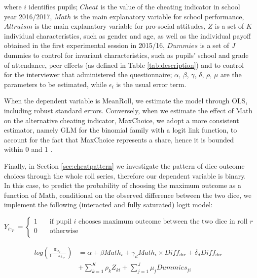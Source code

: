 \documentclass[authoryear, preprint, review, 12pt]{elsarticle}
\begin{document}
where $i$ identifies pupils; $Cheat$ is the value of the cheating indicator in school year 2016/2017, $Math$ is the main explanatory variable for school performance, $Altruism$ is the main explanatory variable for pro-social attitudes, $Z$ is a set of $K$ individual characteristics, such as gender and age, as well as the individual payoff obtained in the first experimental session in 2015/16, $Dummies$ is a set of $J$ dummies to control for invariant characteristics, such as pupils' school and grade of attendance, peer effects (as defined in Table \ref{tab:description}) and to control for the interviewer that administered the questionnaire; $\alpha$, $\beta$, $\gamma$, $\delta$, $\rho$, $\mu$ are the parameters to be estimated, while $\epsilon_{i}$ is the usual error term. 

When the dependent variable is MeanRoll, we estimate the model through OLS, including robust standard errors. Conversely, when we estimate the effect of Math on the alternative cheating indicator, MaxChoice, we adopt a more consistent estimator, namely GLM for the binomial family with a logit link function, to account for the fact that MaxChoice represents a share, hence it is bounded within 0 and 1 \citep{papkewoolridge96}.

Finally, in Section \ref{sec:cheatpattern} we investigate the pattern of dice outcome choices through the whole roll series, therefore our dependent variable is binary. In this case, to predict the probability of choosing the maximum outcome as a function of Math, conditional on the observed difference between the two dice, we implement the following (interacted and fully saturated) logit model:

\[ Y_i,_r =
\begin{cases}
 1  & \quad \text{if pupil $i$ chooses maximum outcome between the two dice in roll $r$} \\
 0  & \quad \text{otherwise}\\
\end{cases}
\]

\begin{equation}\begin{split}
\label{eq:logit}
log\left(\frac{\pi_i,_r}{1-\pi_i,_r}\right) &= \alpha + \beta Math_{i} + \gamma_{d} Math_{i}\times Diff_{dir} + \delta_{d} Diff_{dir} \\ 
                  &+ \sum\limits_{k=1}^K\rho_k Z_{ki} + \sum\limits_{j=1}^J\mu_j Dummies_{ji} 
\end{split}\end{equation}
\end{document}

